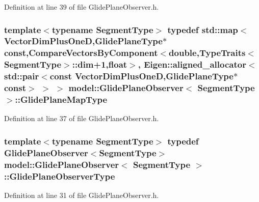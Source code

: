 Definition at line 39 of file Glide\+Plane\+Observer.\+h.

\hypertarget{structmodel_1_1_glide_plane_observer_ad84427bd16fe79b950b870adfbb89dbe}{}
\subsubsection[{Glide\+Plane\+Map\+Type}]{\setlength{\rightskip}{0pt plus 5cm}template$<$typename Segment\+Type$>$ typedef std\+::map$<${\bf Vector\+Dim\+Plus\+One\+D},{\bf Glide\+Plane\+Type}$\ast$ const,{\bf Compare\+Vectors\+By\+Component}$<$double,{\bf Type\+Traits}$<$Segment\+Type$>$\+::{\bf dim}+1,float$>$, Eigen\+::aligned\+\_\+allocator$<$std\+::pair$<$const {\bf Vector\+Dim\+Plus\+One\+D},{\bf Glide\+Plane\+Type}$\ast$ const$>$ $>$ $>$ {\bf model\+::\+Glide\+Plane\+Observer}$<$ Segment\+Type $>$\+::{\bf Glide\+Plane\+Map\+Type}}\label{structmodel_1_1_glide_plane_observer_ad84427bd16fe79b950b870adfbb89dbe}


Definition at line 37 of file Glide\+Plane\+Observer.\+h.

\hypertarget{structmodel_1_1_glide_plane_observer_a008ca4c47f513aff15d4d3b3603707f8}{}
\subsubsection[{Glide\+Plane\+Observer\+Type}]{\setlength{\rightskip}{0pt plus 5cm}template$<$typename Segment\+Type$>$ typedef {\bf Glide\+Plane\+Observer}$<$Segment\+Type$>$ {\bf model\+::\+Glide\+Plane\+Observer}$<$ Segment\+Type $>$\+::{\bf Glide\+Plane\+Observer\+Type}}\label{structmodel_1_1_glide_plane_observer_a008ca4c47f513aff15d4d3b3603707f8}


Definition at line 31 of file Glide\+Plane\+Observer.\+h.

\hypertarget{structmodel_1_1_glide_plane_observer_a1db5edc59e298b9504e29de2081973c4}{}
